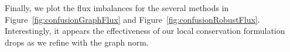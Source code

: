 \documentclass[letterpaper]{article}
\begin{document}
% 

Finally, we plot the flux imbalances for the several methods in
Figure~\ref{fig:confusionGraphFlux} and Figure~\ref{fig:confusionRobustFlux}.
Interestingly, it appears the effectiveness of our local conservation
formulation drops as we refine with the graph norm.
\end{document}
